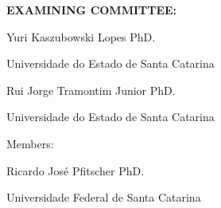 

%
% 
%
\begin{folhadeaprovacao}



	\begin{center}
		{\selectfont\MakeTextUppercase{\normalsize\imprimirautor}}
	\end{center}
    \vfill
    
	\vfill
	\begin{center}
		{\selectfont\MakeTextUppercase{\imprimirtitulo}}
	\end{center}
	\vfill

    
%


\vfill
        
	 \begin{center}
        {\bfseries EXAMINING COMMITTEE: }
        \vspace*{1.75cm}
        
        Yuri Kaszubowski Lopes PhD. \par
        Universidade do Estado de Santa Catarina
        
        \vspace*{1.25cm}
        Rui Jorge Tramontim Junior PhD. \par
        Universidade do Estado de Santa Catarina
    \end{center}
        
    {Members:} 
        
    \begin{center}
        \vspace*{1.25cm}
        Ricardo José Pfitscher PhD. \par
        Universidade Federal de Santa Catarina


\end{center}
\end{folhadeaprovacao}
